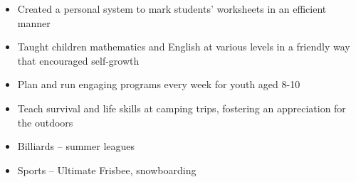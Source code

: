 \documentclass{resume}
\begin{document}
\begin{itemize}
	\item Created a personal system to mark students' worksheets in an efficient manner
	\item Taught children mathematics and English at various levels in a friendly way that encouraged self-growth
\end{itemize}

\VolunteerWorkExperience

\begin{itemize}
	\item Plan and run engaging programs every week for youth aged 8-10
	\item Teach survival and life skills at camping trips, fostering an appreciation for the outdoors
\end{itemize}

\Education


\Intrests

\begin{itemize}
	\item Billiards -- summer leagues
	\item Sports -- Ultimate Frisbee, snowboarding
\end{itemize}
\end{document}
